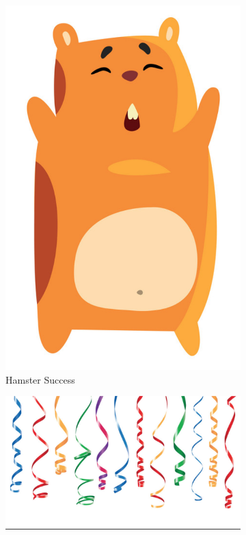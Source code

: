 \documentclass[a4paper]{article}
\begin{document}
\begin{figure}[h!]
  \centering
  \begin{subfigure}[b]{0.25\linewidth}
    \includegraphics[width=\linewidth]{png-creation/hamster-success.png}
    \caption{Hamster Success}
    \label{fig:hamster_success}
  \end{subfigure}
  \begin{subfigure}[b]{0.3\linewidth}
    \includegraphics[width=\linewidth]{png-creation/success-background.png}

\end{subfigure}
\end{figure}
\end{document}
